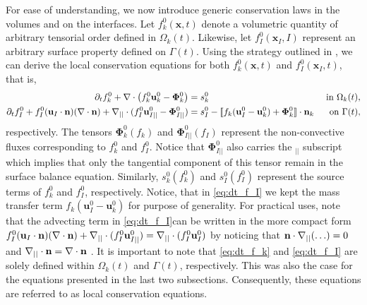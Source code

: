 For ease of understanding, we now introduce generic conservation laws in the volumes and on the interfaces. 
Let $f_k^0(\textbf{x},t)$ denote a volumetric quantity of arbitrary tensorial order defined in $\Omega_k(t)$.
Likewise, let $f_I^0(\textbf{x}_I,I)$ represent an arbitrary surface property defined on $\Gamma(t)$.
Using the strategy outlined in \citep{bothe2022sharp,morel2015mathematical,slattery2007interfacial}, we can derive the local conservation equations for both $f_k^0(\textbf{x},t)$ and $f_I^0(\textbf{x}_I,t)$, that is,  
\begin{align}
    \label{eq:dt_f_k}
    \partial_t f_k^0
    +\mathbf{\nabla}\cdot \left(
        f_k^0\textbf{u}_k^0
        - \mathbf{\Phi}_k^0
        \right)
    &= 
    s_k^0
    & \text{ in } \Omega_k(t),&\\
    \partial_t f_I^0 
    + f_I^0 (\textbf{u}_I \cdot \textbf{n})(\mathbf{\nabla}\cdot \textbf{n})
    +\mathbf{\nabla}_{||}\cdot
    (f_I^0 \textbf{u}_{I||}^0
        - \mathbf{\Phi}_{I||}^0 )
    &= 
    s_I^0
    - \llbracket 
       f_k (\textbf{u}_I^0 - \textbf{u}_k^0)
       + \mathbf{\Phi}_k^0
     \rrbracket \cdot \textbf{n}_k 
    & \text{ on } \Gamma(t),&
    \label{eq:dt_f_I}
\end{align}
respectively.
The tensors $\mathbf{\Phi}_k^0(f_k)$ and $\mathbf{\Phi}_{I||}^0(f_I)$ represent the non-convective fluxes corresponding to $f_k^0$ and $f_I^0$. 
Notice that $\mathbf{\Phi}_{I||}^0$ also carries the $_{||}$ subscript which implies that only the tangential component of this tensor remain in the surface balance equation. 
Similarly, $s_k^0(f_k^0)$ and $s_I^0(f_I^0)$ represent the source terms of $f_k^0$ and $f_I^0$, respectively.
Notice, that in \ref{eq:dt_f_I} we kept the mass transfer term $f_k (\textbf{u}_I^0 - \textbf{u}_k^0)$ for purpose of generality. 
For practical uses, note that the advecting term in \ref{eq:dt_f_I}can be written in the more compact form $f_I^0 (\textbf{u}_I \cdot \textbf{n})(\mathbf{\nabla}\cdot \textbf{n})
+\mathbf{\nabla}_{||}\cdot(f_I^0 \textbf{u}_{I||}^0) = \mathbf{\nabla}_{||}\cdot(f_I^0 \textbf{u}_I^0)$ by noticing that $\textbf{n}\cdot\mathbf{\nabla}_{||}(\ldots) = 0$ and $\mathbf{\nabla}_{||}\cdot\textbf{n} = \mathbf{\nabla}\cdot\textbf{n}$ \citep{nadim1996concise}.
It is important to note that \ref{eq:dt_f_k} and \ref{eq:dt_f_I} are solely defined within $\Omega_k(t)$ and $\Gamma(t)$, respectively.
This was also the case for the equations presented in the last two subsections. 
Consequently, these equations are referred to as local conservation equations. 


